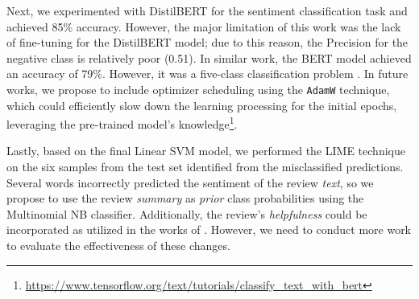 \documentclass[11pt]{article}
\begin{document}
Next, we experimented with DistilBERT for the sentiment classification task and achieved 85\% accuracy. However, the major limitation of this work was the lack of fine-tuning for the DistilBERT model; due to this reason, the Precision for the negative class is relatively poor (0.51). In similar work, the BERT model achieved an accuracy of 79\%. However, it was a five-class classification problem \cite{BERT-finefood}. In future works, we propose to include optimizer scheduling using the 
\texttt{AdamW} \cite{adamw} technique, which could efficiently slow down the learning processing for the initial epochs, leveraging the pre-trained model's knowledge\footnote{\url{https://www.tensorflow.org/text/tutorials/classify_text_with_bert}}. 

Lastly, based on the final Linear SVM model, we performed the LIME technique on the six samples from the test set identified from the misclassified predictions. Several words incorrectly predicted the sentiment of the review \textit{text}, so we propose to use the review \textit{summary} as \textit{prior} class probabilities using the Multinomial NB classifier. Additionally, the review's \textit{helpfulness} could be incorporated as utilized in the works of \cite{helpfulness}. However, we need to conduct more work to evaluate the effectiveness of these changes.






\appendix
\end{document}
